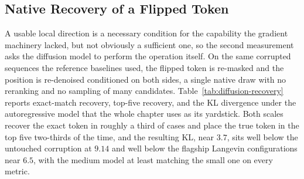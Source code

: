 \subsection{Native Recovery of a Flipped Token}
\label{sec:results-diffusion-recovery}

A usable local direction is a necessary condition for the capability the gradient machinery lacked, but not obviously a sufficient one, so the second measurement asks the diffusion model to perform the operation itself. On the same corrupted sequences the reference baselines used, the flipped token is re-masked and the position is re-denoised conditioned on both sides, a single native draw with no reranking and no sampling of many candidates. Table~\ref{tab:diffusion-recovery} reports exact-match recovery, top-five recovery, and the KL divergence under the autoregressive model that the whole chapter uses as its yardstick. Both scales recover the exact token in roughly a third of cases and place the true token in the top five two-thirds of the time, and the resulting KL, near $3.7$, sits well below the untouched corruption at $9.14$ and well below the flagship Langevin configurations near $6.5$, with the medium model at least matching the small one on every metric. %

